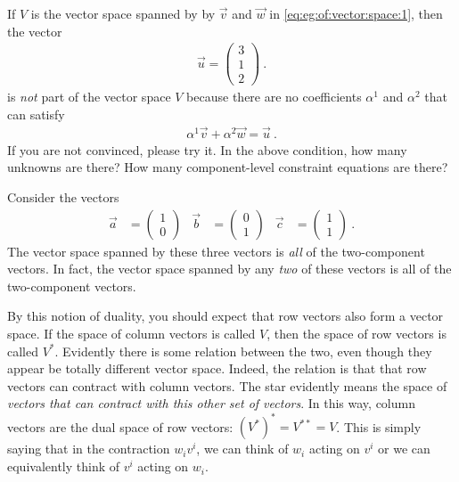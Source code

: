 \documentclass[12pt, oneside]{report}    %
\begin{document}
\begin{example}
If $V$ is the vector space spanned by by $\vec{v}$ and $\vec{w}$ in \eqref{eq:eg:of:vector:space:1}, then the vector
\begin{align}
    \vec{u}
    =
    \begin{pmatrix}
        3 \\ 1 \\ 2
    \end{pmatrix} \ .
\end{align}
is \emph{not} part of the vector space $V$ because there are no coefficients $\alpha^1$ and $\alpha^2$ that can satisfy
\begin{align}
    \alpha^1\vec{v} + \alpha^2 \vec{w} = \vec{u} \ .
\end{align}
If you are not convinced, please try it. In the above condition, how many unknowns are there? How many component-level constraint equations are there?
\end{example}

\begin{example}
Consider the vectors
\begin{align}
    \vec{a}
    &=
    \begin{pmatrix}
        1\\0
    \end{pmatrix}
    &
    \vec{b}
    &=
    \begin{pmatrix}
        0\\1
    \end{pmatrix}
    &
    \vec{c}
    &=
    \begin{pmatrix}
        1\\1
    \end{pmatrix}\ .
\end{align}
The vector space spanned by these three vectors is \emph{all} of the two-component vectors. In fact, the vector space spanned by any \emph{two} of these vectors is all of the two-component vectors. 
\end{example}


By this notion of duality, you should expect that row vectors also form a vector space. If the space of column vectors is called $V$, then the space of row vectors is called $V^*$. Evidently there is some relation between the two, even though they appear be totally different vector space. Indeed, the relation is that that row vectors can contract with column vectors. The star evidently means the space of \emph{vectors that can contract with this other set of vectors}. In this way, column vectors are the dual space of row vectors: $(V^*)^* = V^{**} = V$. This is simply saying that in the contraction $w_i v^i$, we can think of $w_i$ acting on $v^i$ or we can equivalently think of $v^i$ acting on $w_i$. 
\end{document}

